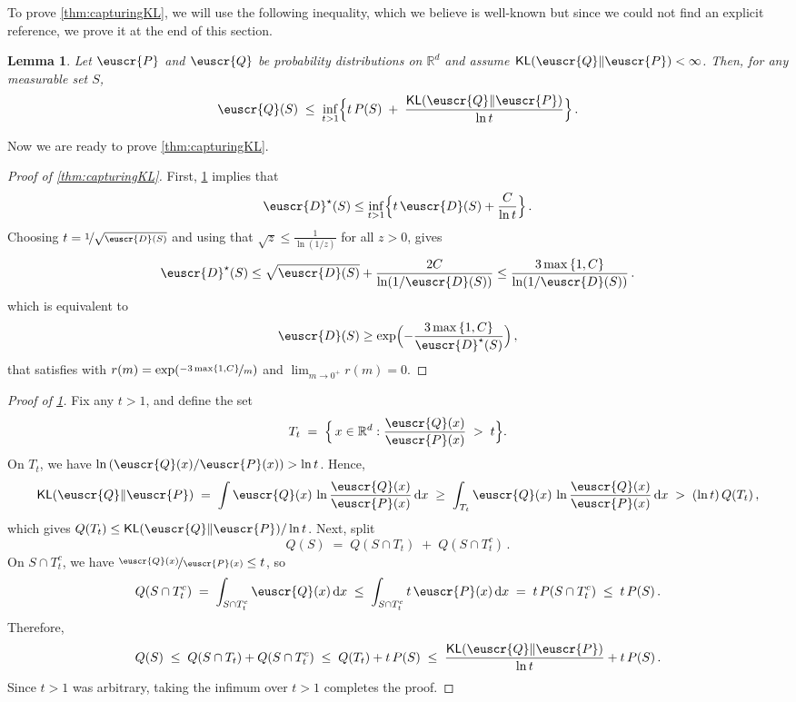 \documentclass[11pt]{article}
\makeatletter
\theoremstyle{plain}
\newtheorem{lemma}[theorem]{Lemma}
\theoremstyle{definition}
\theoremstyle{remark}
\renewcommand{\eqref}[1]{\textup{\eqrefform@{\ref{#1}}}}
\let\eqrefform@\tagform@
\newcommand{\sinparen}[1]{(#1)}
\newcommand{\inbrace}[1]{\left\{#1\right\}}
\newcommand{\inparen}[1]{\left(#1\right)}
\newcommand{\R}{\mathbb{R}}
\newcommand{\kl}[2]{\operatornamewithlimits{\mathsf{KL}}\sinparen{#1\|#2}}
\newcommand{\sfrac}[2]{{#1/#2}}
\newcommand{\nfrac}[2]{\nicefrac{#1}{#2}}
\newcommand{\customcal}[1]{\euscr{#1}}
\newcommand{\cD}{\customcal{D}}
\newcommand{\cP}{\customcal{P}}
\newcommand{\cQ}{\customcal{Q}}
\renewcommand{\d}{{\rm d}}
\newcommand{\cDtrue}{\cD^\star}
\makeatother
\begin{document}
        To prove \cref{thm:capturingKL}, we will use the following inequality, which we believe is well-known but since we could not find an explicit reference, we prove it at the end of this section.
        \begin{lemma}\label{lem:kl_transfer}
            Let $\cP$ and $\cQ$ be probability distributions on $\R^d$ and assume $\kl{\cQ}{\cP} < \infty$. 
            Then, for any measurable set $S$,
            \[
                \cQ(S) \;\le\; 
                \inf_{t>1} \Bigl\{t\,P(S) \;+\; \frac{\kl{\cQ}{\cP}}{\ln t}\Bigr\}\,.
            \]
        \end{lemma}
        Now we are ready to prove \cref{thm:capturingKL}.
        \begin{proof}[Proof of \cref{thm:capturingKL}]
            First, \cref{lem:kl_transfer} implies that
            \[
            \cDtrue(S)\le\inf_{t>1}\Bigl\{t\,\cD(S)+\frac{C}{\ln t}\Bigr\}\,.
            \]
            Choosing $t=\nfrac{1}{\sqrt{\cD(S)}}$ and using that $\sqrt{z}\leq \frac{1}{\ln(1/z)}$ for all $z>0$, gives
            \[
            \cDtrue(S)\le\sqrt{\cD(S)}+\frac{2C}{\ln(1/\cD(S))}\le\frac{3\max\inbrace{1, C}}{\ln(1/\cD(S))}\,.
            \]
            which is equivalent to 
            \[
                \cD(S)\geq \exp\Bigl(-\frac{3 \max\inbrace{1, C}}{\cDtrue(S)}\Bigr)\,,
            \]
            that satisfies \eqref{eq:mostGeneral:smoothness} with $r(m)=\exp(\nfrac{-3\max\inbrace{1, C}}{m})$ and $\lim_{m\to0^+}r(m)=0$.
        \end{proof}
        \begin{proof}[Proof of \cref{lem:kl_transfer}]
        Fix any $t>1$, and define the set
        \[
        T_t \;=\; \Bigl\{\, x \in \R^d : \frac{\cQ(x)}{\cP(x)} \;>\; t \Bigr\}.
        \]
        On $T_t$, we have $\ln\inparen{\sfrac{\cQ(x)}{\cP(x)}} > \ln t$. Hence,
        \[
        \kl{\cQ}{\cP} \;=\; \int \cQ(x)\,\ln{\frac{\cQ(x)}{\cP(x)}}\,\d x
        \;\ge\; \int_{T_t} \cQ(x)\,\ln{\frac{\cQ(x)}{\cP(x)}}\,\d x
        \;>\; (\ln t)\,Q(T_t)\,,
        \]
        which gives $Q(T_t) \le \kl{\cQ}{\cP}/\ln t$. Next, split
        \[
        Q(S) \;=\; Q(S \cap T_t) \;+\; Q(S \cap T_t^c)\,.
        \]
        On $S \cap T_t^c$, we have $\nfrac{\cQ(x)}{\cP(x)} \le t$, so
        \[
        Q(S \cap T_t^c)
        \;=\; \int_{S \cap T_t^c} \cQ(x)\,\d x
        \;\le\; \int_{S \cap T_t^c} t\,\cP(x)\,\d x
        \;=\; t\,P(S \cap T_t^c)
        \;\le\; t\,P(S)\,.
        \]
        Therefore,
        \[
        Q(S) \;\le\; Q(S \cap T_t) + Q(S \cap T_t^c)
        \;\le\; Q(T_t) + t\,P(S)
        \;\le\;
        \frac{\kl{\cQ}{\cP}}{\ln t} + t\,P(S)\,.
        \]
        Since $t>1$ was arbitrary, taking the infimum over $t>1$ completes the proof.
        \end{proof}
\end{document}
